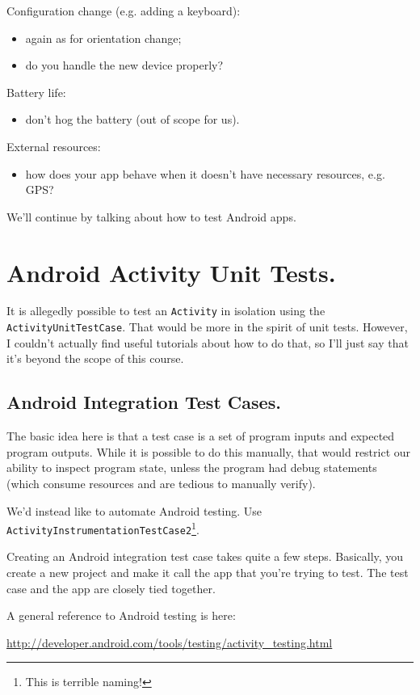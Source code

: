 Configuration change (e.g. adding a keyboard):
\begin{itemize}
\item again as for orientation change;
\item do you handle the new device properly?
\end{itemize}

Battery life:
\begin{itemize}
\item don't hog the battery (out of scope for us).
\end{itemize}

External resources:
\begin{itemize}
\item how does your app behave when it doesn't have
necessary resources, e.g. GPS?
\end{itemize}

We'll continue by talking about how to test Android apps.


\section*{Android Activity Unit Tests.} It is allegedly possible to test an
{\tt Activity} in isolation using the {\tt ActivityUnitTestCase}. That
would be more in the spirit of unit tests. However, I couldn't
actually find useful tutorials about how to do that, so I'll just say
that it's beyond the scope of this course.

\subsection*{Android Integration Test Cases.}
The basic idea here is that a test case is a set of program inputs and
expected program outputs. While it is possible to do this manually,
that would restrict our ability to inspect program state, unless the
program had debug statements (which consume resources and are tedious
to manually verify).

We'd instead like to automate Android testing. Use {\tt ActivityInstrumentationTestCase2}\footnote{This is terrible naming!}.

Creating an Android integration test case takes quite a few steps.
Basically, you create a new project and make it call the app that
you're trying to test. The test case and the app are closely tied together.

A general reference to Android testing is here:

\begin{center}
{\url{http://developer.android.com/tools/testing/activity_testing.html}}
\end{center}

